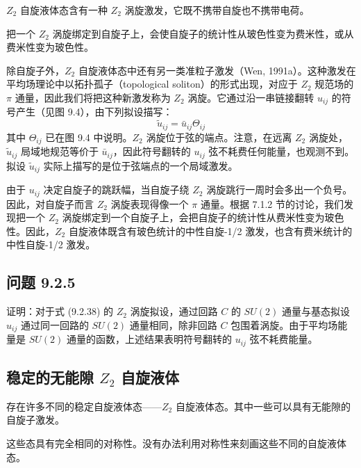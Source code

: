 \begin{keypoints}
\item $Z_2$ 自旋液体态含有一种 $Z_2$ 涡旋激发，它既不携带自旋也不携带电荷。
\item 把一个 $Z_2$ 涡旋绑定到自旋子上，会使自旋子的统计性从玻色性变为费米性，或从费米性变为玻色性。
\end{keypoints}

除自旋子外，$Z_2$ 自旋液体态中还有另一类准粒子激发（Wen, 1991a）。这种激发在平均场理论中以拓扑孤子（topological soliton）的形式出现，对应于 $Z_2$ 规范场的 $\pi$ 通量，因此我们将把这种新激发称为 $Z_2$ 涡旋。它通过沿一串链接翻转 $u_{ij}$ 的符号产生（见图 9.4），由下列拟设描写：
\begin{equation*}
\tilde{u}_{ij}=\bar{u}_{ij}\Theta_{ij}
\tag{9.2.38}
\end{equation*}
其中 $\Theta_{ij}$ 已在图 9.4 中说明。$Z_2$ 涡旋位于弦的端点。注意，在远离 $Z_2$ 涡旋处，$\tilde{u}_{ij}$ 局域地规范等价于 $\bar{u}_{ij}$，因此符号翻转的 $u_{ij}$ 弦不耗费任何能量，也观测不到。拟设 $\tilde{u}_{ij}$ 实际上描写的是位于弦端点的一个局域激发。

由于 $u_{ij}$ 决定自旋子的跳跃幅，当自旋子绕 $Z_2$ 涡旋跳行一周时会多出一个负号。因此，对自旋子而言 $Z_2$ 涡旋表现得像一个 $\pi$ 通量。根据 7.1.2 节的讨论，我们发现把一个 $Z_2$ 涡旋绑定到一个自旋子上，会把自旋子的统计性从费米性变为玻色性。因此，$Z_2$ 自旋液体既含有玻色统计的中性自旋-1/2 激发，也含有费米统计的中性自旋-1/2 激发。

\subsection*{问题 9.2.5}

证明：对于式 (9.2.38) 的 $Z_2$ 涡旋拟设，通过回路 $C$ 的 $SU(2)$ 通量与基态拟设 $u_{ij}$ 通过同一回路的 $SU(2)$ 通量相同，除非回路 $C$ 包围着涡旋。由于平均场能量是 $SU(2)$ 通量的函数，上述结果表明符号翻转的 $u_{ij}$ 弦不耗费能量。

\subsection{稳定的无能隙 $Z_2$ 自旋液体}

\begin{keypoints}
\item 存在许多不同的稳定自旋液体态——$Z_2$ 自旋液体态。其中一些可以具有无能隙的自旋子激发。
\item 这些态具有完全相同的对称性。没有办法利用对称性来刻画这些不同的自旋液体态。
\end{keypoints}

